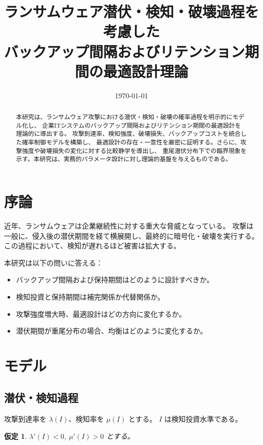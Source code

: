 \documentclass[12pt,a4paper]{article}
\title{ランサムウェア潜伏・検知・破壊過程を考慮した\\
バックアップ間隔およびリテンション期間の最適設計理論}
\author{}
\date{\today}
\theoremstyle{plain}
\newtheorem{assumption}{仮定}
\begin{document}
\maketitle

\begin{abstract}
本研究は、ランサムウェア攻撃における潜伏・検知・破壊の確率過程を明示的にモデル化し、
企業ITシステムのバックアップ間隔およびリテンション期間の最適設計を理論的に導出する。
攻撃到達率、検知強度、破壊損失、バックアップコストを統合した確率制御モデルを構築し、
最適設計の存在・一意性を厳密に証明する。さらに、攻撃強度や破壊損失の変化に対する比較静学を導出し、
重尾潜伏分布下での臨界現象を示す。本研究は、実務的パラメータ設計に対し理論的基盤を与えるものである。
\end{abstract}

\section{序論}

近年、ランサムウェアは企業継続性に対する重大な脅威となっている。
攻撃は一般に、侵入後の潜伏期間を経て横展開し、最終的に暗号化・破壊を実行する。
この過程において、検知が遅れるほど被害は拡大する。

本研究は以下の問いに答える：

\begin{itemize}
\item バックアップ間隔および保持期間はどのように設計すべきか。
\item 検知投資と保持期間は補完関係か代替関係か。
\item 攻撃強度増大時、最適設計はどの方向に変化するか。
\item 潜伏期間が重尾分布の場合、均衡はどのように変化するか。
\end{itemize}

\section{モデル}

\subsection{潜伏・検知過程}

攻撃到達率を $\lambda(I)$、検知率を $\mu(I)$ とする。
$I$ は検知投資水準である。

\begin{assumption}
$\lambda'(I)<0$, $\mu'(I)>0$ とする。
\end{assumption}
\end{document}
